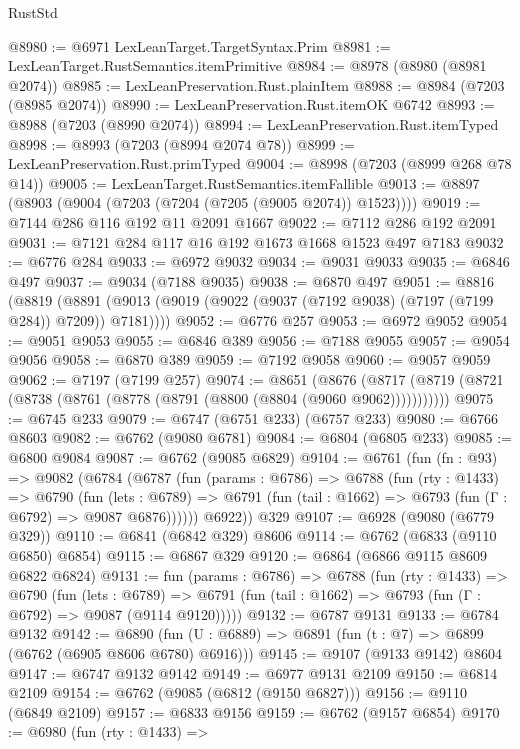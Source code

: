 \begin{lexlean}{RustStd}
\begin{coremodule}
{\begin{coremodule}
{{{{{{{{{{{{{{{{{{{{{{{{{{{{{{{{{{{{{{{{{{{{@8980 := @6971 LexLeanTarget.TargetSyntax.Prim
@8981 := LexLeanTarget.RustSemantics.itemPrimitive
@8984 := @8978 (@8980 (@8981 @2074))
@8985 := LexLeanPreservation.Rust.plainItem
@8988 := @8984 (@7203 (@8985 @2074))
@8990 := LexLeanPreservation.Rust.itemOK @6742
@8993 := @8988 (@7203 (@8990 @2074))
@8994 := LexLeanPreservation.Rust.itemTyped
@8998 := @8993 (@7203 (@8994 @2074 @78))
@8999 := LexLeanPreservation.Rust.primTyped
@9004 := @8998 (@7203 (@8999 @268 @78 @14))
@9005 := LexLeanTarget.RustSemantics.itemFallible
@9013 := @8897 (@8903 (@9004 (@7203 (@7204 (@7205 (@9005 @2074)) @1523))))
@9019 := @7144 @286 @116 @192 @11 @2091 @1667
@9022 := @7112 @286 @192 @2091
@9031 := @7121 @284 @117 @16 @192 @1673 @1668 @1523 @497 @7183
@9032 := @6776 @284
@9033 := @6972 @9032
@9034 := @9031 @9033
@9035 := @6846 @497
@9037 := @9034 (@7188 @9035)
@9038 := @6870 @497
@9051 := @8816
    (@8819 (@8891 (@9013 (@9019 (@9022 (@9037 (@7192 @9038) (@7197 (@7199 @284)) @7209)) @7181))))
@9052 := @6776 @257
@9053 := @6972 @9052
@9054 := @9051 @9053
@9055 := @6846 @389
@9056 := @7188 @9055
@9057 := @9054 @9056
@9058 := @6870 @389
@9059 := @7192 @9058
@9060 := @9057 @9059
@9062 := @7197 (@7199 @257)
@9074 := @8651
    (@8676 (@8717 (@8719 (@8721 (@8738 (@8761 (@8778 (@8791 (@8800 (@8804 (@9060 @9062)))))))))))
@9075 := @6745 @233
@9079 := @6747 (@6751 @233) (@6757 @233)
@9080 := @6766 @8603
@9082 := @6762 (@9080 @6781)
@9084 := @6804 (@6805 @233)
@9085 := @6800 @9084
@9087 := @6762 (@9085 @6829)
@9104 := @6761
    (fun (fn : @93) =>
    @9082
      (@6784
        (@6787
          (fun (params : @6786) =>
          @6788
            (fun (rty : @1433) =>
            @6790
              (fun (lets : @6789) =>
              @6791 (fun (tail : @1662) => @6793 (fun (Γ : @6792) => @9087 @6876))))))
        @6922))
    @329
@9107 := @6928 (@9080 (@6779 @329))
@9110 := @6841 (@6842 @329) @8606
@9114 := @6762 (@6833 (@9110 @6850) @6854)
@9115 := @6867 @329
@9120 := @6864 (@6866 @9115 @8609 @6822 @6824)
@9131 := fun (params : @6786) =>
  @6788
    (fun (rty : @1433) =>
    @6790
      (fun (lets : @6789) =>
      @6791 (fun (tail : @1662) => @6793 (fun (Γ : @6792) => @9087 (@9114 @9120)))))
@9132 := @6787 @9131
@9133 := @6784 @9132
@9142 := @6890 (fun (U : @6889) => @6891 (fun (t : @7) => @6899 (@6762 (@6905 @8606 @6780) @6916)))
@9145 := @9107 (@9133 @9142) @8604
@9147 := @6747 @9132 @9142
@9149 := @6977 @9131 @2109
@9150 := @6814 @2109
@9154 := @6762 (@9085 (@6812 (@9150 @6827)))
@9156 := @9110 (@6849 @2109)
@9157 := @6833 @9156
@9159 := @6762 (@9157 @6854)
@9170 := @6980
    (fun (rty : @1433) =>
}}}}}}}}}}}}}}}}}}}}}}}}}}}}}}}}}}}}}}}}}}}}
\end{coremodule}}
\end{coremodule}
\end{lexlean}
